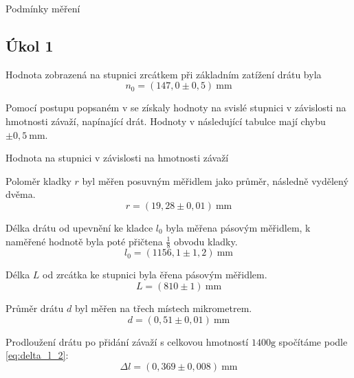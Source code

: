 \documentclass[protokol.tex]{subfiles}
\begin{document}

\begin{table}[H] \label{tab:podminky}
\centering
\setlength{\tabcolsep}{10pt}

\caption{Podmínky měření}
\end{table}

\subsection*{Úkol 1}
Hodnota zobrazená na stupnici zrcátkem při základním zatížení drátu byla 
$$ n_0 = (147,0 \pm 0,5) \ \si{\milli\metre} $$

\newpage

Pomocí postupu popsaném v \cite{stud_text} se získaly hodnoty na svislé stupnici v závislosti na hmotnosti závaží, napínající drát. Hodnoty v následující tabulce mají chybu $\pm 0,5 \ \si{\milli\metre}$.
\begin{table}[H] \label{tab:drat_prodlouzeni}
\centering
\setlength{\tabcolsep}{15pt}

\caption{Hodnota na stupnici v závislosti na hmotnosti závaží}
\end{table}

Poloměr kladky $r$ byl měřen posuvným měřidlem jako průměr, následně vydělený dvěma.
$$ r = (19,28 \pm 0,01) \ \si{\milli\metre} $$

Délka drátu od upevnění ke kladce $l_0$ byla měřena pásovým měřidlem, k naměřené hodnotě byla poté přičtena $\frac{1}{8}$ obvodu kladky.
$$ l_0 = (1156,1 \pm 1,2) \ \si{\milli\metre} $$

Délka $L$ od zrcátka ke stupnici byla ěřena pásovým měřidlem.
$$ L = (810 \pm 1) \ \si{\milli\metre} $$

Průměr drátu $d$ byl měřen na třech místech mikrometrem.
$$ d = (0,51 \pm 0,01) \ \si{\milli\metre} $$

Prodloužení drátu po přidání závaží s celkovou hmotností $1400 \si{\gram}$ spočítáme podle \eqref{eq:delta_l_2}:
$$ \Delta l = (0,369 \pm 0,008) \ \si{\milli\metre} $$
\end{document}
